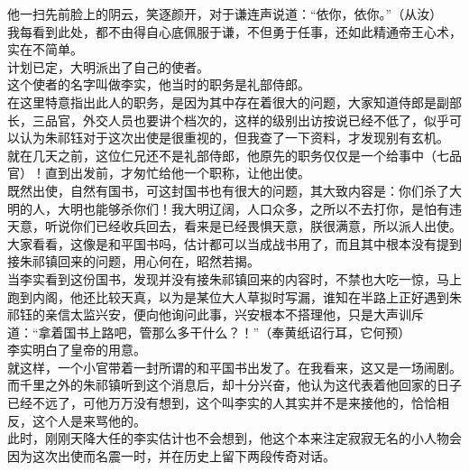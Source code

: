 \begin{multicols}{\theparacolNo}
他一扫先前脸上的阴云，笑逐颜开，对于谦连声说道：“依你，依你。”（从汝）\\

我每看到此处，都不由得自心底佩服于谦，不但勇于任事，还如此精通帝王心术，实在不简单。\\

计划已定，大明派出了自己的使者。\\

这个使者的名字叫做李实，他当时的职务是礼部侍郎。\\

在这里特意指出此人的职务，是因为其中存在着很大的问题，大家知道侍郎是副部长，三品官，外交人员也要讲个档次的，这样的级别出访按说已经不低了，似乎可以认为朱祁钰对于这次出使是很重视的，但我查了一下资料，才发现别有玄机。\\

就在几天之前，这位仁兄还不是礼部侍郎，他原先的职务仅仅是一个给事中（七品官）！直到出发前，才匆忙给他一个职称，让他出使。\\

既然出使，自然有国书，可这封国书也有很大的问题，其大致内容是：你们杀了大明的人，大明也能够杀你们！我大明辽阔，人口众多，之所以不去打你，是怕有违天意，听说你们已经收兵回去，看来是已经畏惧天意，朕很满意，所以派人出使。\\

大家看看，这像是和平国书吗，估计都可以当成战书用了，而且其中根本没有提到接朱祁镇回来的问题，用心何在，昭然若揭。\\

当李实看到这份国书，发现并没有接朱祁镇回来的内容时，不禁也大吃一惊，马上跑到内阁，他还比较天真，以为是某位大人草拟时写漏，谁知在半路上正好遇到朱祁钰的亲信太监兴安，便向他询问此事，兴安根本不搭理他，只是大声训斥道：“拿着国书上路吧，管那么多干什么？！”（奉黄纸诏行耳，它何预）\\

李实明白了皇帝的用意。\\

就这样，一个小官带着一封所谓的和平国书出发了。在我看来，这又是一场闹剧。\\

而千里之外的朱祁镇听到这个消息后，却十分兴奋，他认为这代表着他回家的日子已经不远了，可他万万没有想到，这个叫李实的人其实并不是来接他的，恰恰相反，这个人是来骂他的。\\

此时，刚刚天降大任的李实估计也不会想到，他这个本来注定寂寂无名的小人物会因为这次出使而名震一时，并在历史上留下两段传奇对话。\\


\end{multicols}

